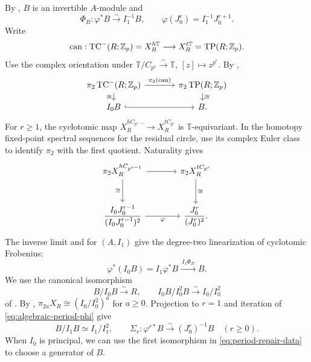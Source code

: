 By \cite[Constructions 2.2.11, 2.2.14 and
Proposition 2.2.12]{BhattLurie}, $B$ is an invertible $A$-module and
\begin{equation}\label{eq:algebraic-period-phi}
 \Phi_B:\varphi^*B\xrightarrow{\sim}I_1^{-1}B,
 \qquad \varphi(J_0^r)=I_1^{-1}J_0^{r+1}.
\end{equation}
Write
\[
\operatorname{can}:
\operatorname{TC}^-(R;\mathbb Z_p)=X_R^{h\mathbb T}
\longrightarrow X_R^{t\mathbb T}=\operatorname{TP}(R;\mathbb Z_p).
\]
Use the complex orientation under
$\mathbb T/C_{p^r}\xrightarrow{\sim}\mathbb T$,
$[z]\mapsto z^{p^r}$.
By \cite[Proposition~6.5 and Remark~6.6]{BMS},
\[
\begin{tikzcd}[column sep=large,row sep=small]
\pi_2\operatorname{TC}^-(R;\Z_p)
  \arrow[r,"\pi_2(\operatorname{can})"] \arrow[d,"\cong"']
& \pi_2\operatorname{TP}(R;\Z_p) \arrow[d,"\cong"] \\
I_0B \arrow[r,hook] & B.
\end{tikzcd}
\]
For $r\ge1$, the cyclotomic map
$X_R^{hC_{p^{r-1}}}\to X_R^{tC_{p^r}}$
is $\mathbb T$-equivariant.
In the homotopy fixed-point spectral sequences for the residual circle,
use its complex Euler class to identify $\pi_2$ with the first
quotient. Naturality \cite[Remark~6.6]{BMS} gives
\[
\begin{tikzcd}[column sep=large,row sep=large]
\pi_2 X_R^{hC_{p^{r-1}}}
  \arrow[r] \arrow[d,"\cong"']
& \pi_2 X_R^{tC_{p^r}} \arrow[d,"\cong"] \\
\dfrac{I_0J_0^{r-1}}{(I_0J_0^{r-1})^2}
  \arrow[r,"\varphi"']
& \dfrac{J_0^r}{(J_0^r)^2}.
\end{tikzcd}
\]
The inverse limit and \cite[Construction~2.2.14]{BhattLurie}
for $(A,I_1)$ give the degree-two linearization of cyclotomic Frobenius:
\[
\varphi^*(I_0B)=I_1\varphi^*B
 \xrightarrow{\ I_1\Phi_B\ }B.
\]
We use the canonical isomorphism
\begin{equation}\label{eq:period-cotangent-reduction}
B/I_0B\xrightarrow{\sim}R,\qquad
I_0B/I_0^2B\xrightarrow{\sim}I_0/I_0^2
\end{equation}
of \cite[Proposition~6.5 and the preceding discussion]{BMS}. By \cite[Theorem~6.1]{BMS},
$\pi_{2a}X_R\cong(I_0/I_0^2)^a$ for $a\ge0$. Projection to $r=1$ and iteration of \eqref{eq:algebraic-period-phi} give
\begin{equation}\label{eq:period-repair-data}
B/I_1B\simeq I_1/I_1^2,\qquad
 \Sigma_r:\varphi^{r*}B\xrightarrow{\sim}(J_0^r)^{-1}B\quad(r\ge0).
\end{equation}
When $I_0$ is principal, we can use the first isomorphism
in \eqref{eq:period-repair-data} to choose a generator of $B$.


